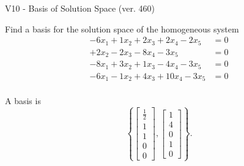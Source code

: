 \begin{exercise}
  \begin{exerciseTitle}V10 - Basis of Solution Space (ver. 460)\end{exerciseTitle}
  \begin{exerciseStatement}
    Find a basis for the solution space of the homogeneous system 
\begin{align*}
 -6 x_ 1 + 1 x_ 2 + 2 x_ 3 + 2 x_ 4 -2 x_ 5 &= 0  \\ 
  + 2 x_ 2 -2 x_ 3 -8 x_ 4 -3 x_ 5 &= 0  \\ 
  -8 x_ 1 + 3 x_ 2 + 1 x_ 3 -4 x_ 4 -3 x_ 5 &= 0  \\ 
  -6 x_ 1 -1 x_ 2 + 4 x_ 3 + 10 x_ 4 -3 x_ 5 &= 0  \\ 
 \end{align*}


 
  \end{exerciseStatement}

  \begin{exerciseAnswer}
   A basis is   
\[\left\{\left[\begin{array}{c}
\frac{1}{2} \\
1 \\
1 \\
0 \\
0
\end{array}\right] , \left[\begin{array}{c}
1 \\
4 \\
0 \\
1 \\
0
\end{array}\right]\right\}.\]

  


  \end{exerciseAnswer}
\end{exercise}